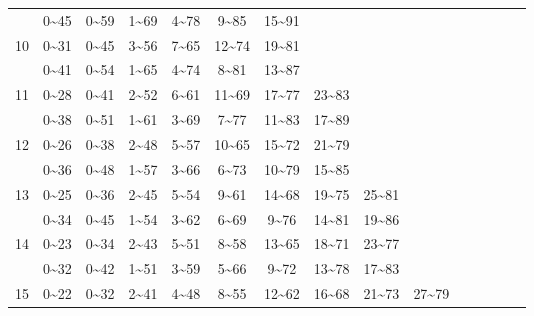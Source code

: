 \documentclass[lang=cn,10pt]{elegantbook}
\begin{document}
\begin{longtable}{c|cccccccccccccc}
      & 0\textasciitilde45 & 0\textasciitilde59 & 1\textasciitilde69 & 4\textasciitilde78 & 9\textasciitilde85 & 15\textasciitilde91 & & & & & & & & \\
    10 & 0\textasciitilde31 & 0\textasciitilde45 & 3\textasciitilde56 & 7\textasciitilde65 & 12\textasciitilde74 & 19\textasciitilde81 & & & & & & & & \\
       & 0\textasciitilde41 & 0\textasciitilde54 & 1\textasciitilde65 & 4\textasciitilde74 & 8\textasciitilde81 & 13\textasciitilde87 & & & & & & & & \\
    11 & 0\textasciitilde28 & 0\textasciitilde41 & 2\textasciitilde52 & 6\textasciitilde61 & 11\textasciitilde69 & 17\textasciitilde77 & 23\textasciitilde83 & & & & & & & \\
       & 0\textasciitilde38 & 0\textasciitilde51 & 1\textasciitilde61 & 3\textasciitilde69 & 7\textasciitilde77 & 11\textasciitilde83 & 17\textasciitilde89 & & & & & & & \\
    12 & 0\textasciitilde26 & 0\textasciitilde38 & 2\textasciitilde48 & 5\textasciitilde57 & 10\textasciitilde65 & 15\textasciitilde72 & 21\textasciitilde79 & & & & & & & \\
       & 0\textasciitilde36 & 0\textasciitilde48 & 1\textasciitilde57 & 3\textasciitilde66 & 6\textasciitilde73 & 10\textasciitilde79 & 15\textasciitilde85 & & & & & & & \\
    13 & 0\textasciitilde25 & 0\textasciitilde36 & 2\textasciitilde45 & 5\textasciitilde54 & 9\textasciitilde61 & 14\textasciitilde68 & 19\textasciitilde75 & 25\textasciitilde81 & & & & & & \\
       & 0\textasciitilde34 & 0\textasciitilde45 & 1\textasciitilde54 & 3\textasciitilde62 & 6\textasciitilde69 & 9\textasciitilde76 & 14\textasciitilde81 & 19\textasciitilde86 & & & & & & \\
    14 & 0\textasciitilde23 & 0\textasciitilde34 & 2\textasciitilde43 & 5\textasciitilde51 & 8\textasciitilde58 & 13\textasciitilde65 & 18\textasciitilde71 & 23\textasciitilde77 & & & & & & \\
       & 0\textasciitilde32 & 0\textasciitilde42 & 1\textasciitilde51 & 3\textasciitilde59 & 5\textasciitilde66 & 9\textasciitilde72 & 13\textasciitilde78 & 17\textasciitilde83 & & & & & & \\
    15 & 0\textasciitilde22 & 0\textasciitilde32 & 2\textasciitilde41 & 4\textasciitilde48 & 8\textasciitilde55 & 12\textasciitilde62 & 16\textasciitilde68 & 21\textasciitilde73 & 27\textasciitilde79 & & & & & \\

\end{longtable}
\end{document}
